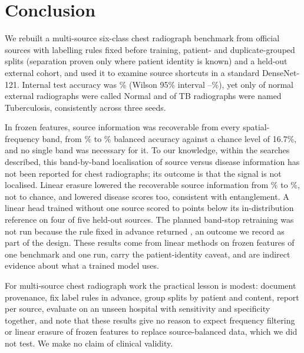 \section{Conclusion}
\label{sec:conclusion}

We rebuilt a multi-source six-class chest radiograph benchmark from official sources with labelling rules fixed before training, patient- and duplicate-grouped splits (separation proven only where patient identity is known) and a held-out external cohort, and used it to examine source shortcuts in a standard DenseNet-121. Internal test accuracy was \RTestAcc\% (Wilson 95\% interval \RTestAccLo--\RTestAccHi\%), yet only \RExtSpecK{} of \RExtSpecN{} normal external radiographs were called Normal and \RExtTBK{} of \RExtTBN{} TB radiographs were named Tuberculosis, consistently across three seeds.

In frozen features, source information was recoverable from every spatial-frequency band, from \RSpecMainTestPassASrcBA\% to \RSpecMainTestPassFSrcBA\% balanced accuracy against a chance level of 16.7\%, and no single band was necessary for it. To our knowledge, within the searches described, this band-by-band localisation of source versus disease information has not been reported for chest radiographs; its outcome is that the signal is not localised. Linear erasure lowered the recoverable source information from \RInlpImgTestSrcBAKZero\% to \RInlpImgTestSrcBAKStar\%, not to chance, and lowered disease scores too, consistent with entanglement. A linear head trained without one source scored \RLosoImgCohenGap{} to \RLosoImgTBXkGap{} points below its in-distribution reference on four of five held-out sources. The planned band-stop retraining was not run because the rule fixed in advance returned \RBsDecision, an outcome we record as part of the design. These results come from linear methods on frozen features of one benchmark and one run, carry the patient-identity caveat, and are indirect evidence about what a trained model uses.

For multi-source chest radiograph work the practical lesson is modest: document provenance, fix label rules in advance, group splits by patient and content, report per source, evaluate on an unseen hospital with sensitivity and specificity together, and note that these results give no reason to expect frequency filtering or linear erasure of frozen features to replace source-balanced data, which we did not test. We make no claim of clinical validity.
